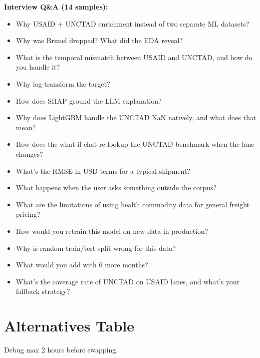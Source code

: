 \documentclass[11pt, a4paper]{article}
\begin{document}
\textbf{Interview Q\&A (14 samples):}
\begin{itemize}[noitemsep]
  \item Why USAID + UNCTAD enrichment instead of two separate ML datasets?
  \item Why was Brunel dropped? What did the EDA reveal?
  \item What is the temporal mismatch between USAID and UNCTAD, and how do you handle it?
  \item Why log-transform the target?
  \item How does SHAP ground the LLM explanation?
  \item Why does LightGBM handle the UNCTAD NaN natively, and what does that mean?
  \item How does the what-if chat re-lookup the UNCTAD benchmark when the lane changes?
  \item What's the RMSE in USD terms for a typical shipment?
  \item What happens when the user asks something outside the corpus?
  \item What are the limitations of using health commodity data for general freight pricing?
  \item How would you retrain this model on new data in production?
  \item Why is random train/test split wrong for this data?
  \item What would you add with 6 more months?
  \item What's the coverage rate of UNCTAD on USAID lanes, and what's your fallback strategy?
\end{itemize}

\section{Alternatives Table}

Debug max 2 hours before swapping.
\end{document}
